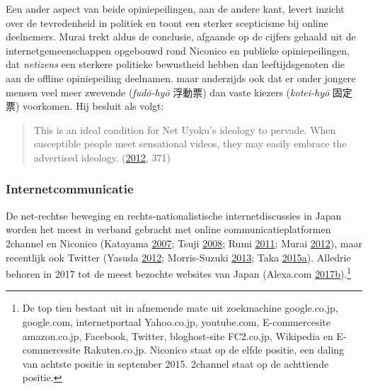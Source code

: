 \documentclass[10.5pt,dutch,]{article}
\begin{document}
Een ander aspect van beide opiniepeilingen, aan de andere kant, levert
inzicht over de tevredenheid in politiek en toont een sterker
scepticisme bij online deelnemers. Murai trekt aldus de conclusie,
afgaande op de cijfers gehaald uit de internetgemeenschappen opgebouwd
rond Niconico en publieke opiniepeilingen, dat \emph{netizens} een
sterkere politieke bewustheid hebben dan leeftijdsgenoten die aan de
offline opiniepeiling deelnamen. maar anderzijds ook dat er onder
jongere mensen veel meer zwevende (\emph{fudō-hyō} 浮動票) dan vaste
kiezers (\emph{kotei-hyō} 固定票) voorkomen. Hij besluit als volgt:

\begin{quote}
This is an ideal condition for Net Uyoku's ideology to pervade. When
susceptible people meet sensational videos, they may easily embrace the
advertised ideology.
(\protect\hyperlink{ref-muraiux5fnetux5f2012}{2012}, 371)
\end{quote}

\subsubsection{Internetcommunicatie}\label{internetcommunicatie}

De net-rechtse beweging en rechts-nationalistische internetdiscussies in
Japan worden het meest in verband gebracht met online
communicatieplatformen 2channel en Niconico (Katayama
\protect\hyperlink{ref-katayamaux5f2-channelux5f2007}{2007}; Tsuji
\protect\hyperlink{ref-tsujiux5fintanettoux5f2008}{2008}; Rumi
\protect\hyperlink{ref-rumiux5fkoreansux5f2011}{2011}; Murai
\protect\hyperlink{ref-muraiux5fnetux5f2012}{2012}), maar recentlijk ook
Twitter (Yasuda \protect\hyperlink{ref-yasudaux5fnettoux5f2012}{2012};
Morris-Suzuki
\protect\hyperlink{ref-morris-suzukiux5ffreedomux5f2013}{2013}; Taka
\protect\hyperlink{ref-takaux5ftwitterux5f2015-1}{2015}\protect\hyperlink{ref-takaux5ftwitterux5f2015-1}{a}).
Alledrie behoren in 2017 tot de meest bezochte websites van Japan
(Alexa.com
\protect\hyperlink{ref-alexa.comux5ftopux5f2017}{2017}\protect\hyperlink{ref-alexa.comux5ftopux5f2017}{b}).\footnote{De
  top tien bestaat uit in afnemende mate uit zoekmachine google.co.jp,
  google.com, internetportaal Yahoo.co.jp, youtube.com, E-commercesite
  amazon.co.jp, Facebook, Twitter, bloghost-site FC2.co.jp, Wikipedia en
  E-commercesite Rakuten.co.jp. Niconico staat op de elfde positie, een
  daling van achtste positie in september 2015. 2channel staat op de
  achttiende positie.}
\end{document}
